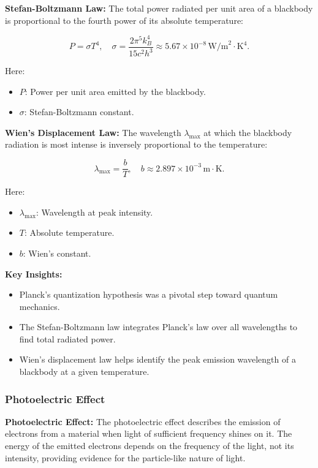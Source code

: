 \documentclass{article}
\newcommand{\eqbox}[1]{\begin{tcolorbox}[colback=gray!10] #1 \end{tcolorbox}}
\newcommand{\conceptbox}[1]{\begin{tcolorbox}[colback=blue!10] #1 \end{tcolorbox}}
\begin{document}
\conceptbox{
\textbf{Stefan-Boltzmann Law:}
The total power radiated per unit area of a blackbody is proportional to the fourth power of its absolute temperature:
\eqbox{
\[
P = \sigma T^4, \quad \sigma = \frac{2\pi^5 k_B^4}{15c^2h^3} \approx 5.67 \times 10^{-8} \, \text{W/m}^2\cdot \text{K}^4.
\]
}
Here:
\begin{itemize}
    \item \( P \): Power per unit area emitted by the blackbody.
    \item \( \sigma \): Stefan-Boltzmann constant.
\end{itemize}
}

\conceptbox{
\textbf{Wien's Displacement Law:}
The wavelength \( \lambda_{\text{max}} \) at which the blackbody radiation is most intense is inversely proportional to the temperature:
\eqbox{
\[
\lambda_{\text{max}} = \frac{b}{T}, \quad b \approx 2.897 \times 10^{-3} \, \text{m} \cdot \text{K}.
\]
}
Here:
\begin{itemize}
    \item \( \lambda_{\text{max}} \): Wavelength at peak intensity.
    \item \( T \): Absolute temperature.
    \item \( b \): Wien's constant.
\end{itemize}
}

\conceptbox{
\textbf{Key Insights:}
\begin{itemize}
    \item Planck's quantization hypothesis was a pivotal step toward quantum mechanics.
    \item The Stefan-Boltzmann law integrates Planck's law over all wavelengths to find total radiated power.
    \item Wien's displacement law helps identify the peak emission wavelength of a blackbody at a given temperature.
\end{itemize}
}

\subsubsection{Photoelectric Effect}

\conceptbox{
\textbf{Photoelectric Effect:}
The photoelectric effect describes the emission of electrons from a material when light of sufficient frequency shines on it. The energy of the emitted electrons depends on the frequency of the light, not its intensity, providing evidence for the particle-like nature of light.
}
\end{document}
